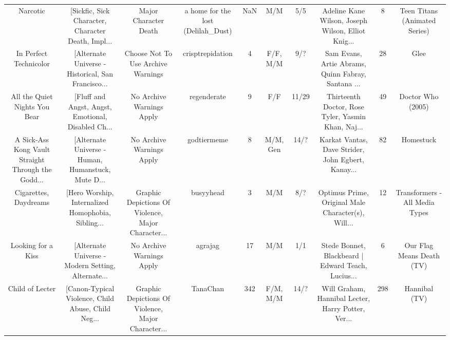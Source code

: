 \begin{table}[h!]
{\begin{tabular}{|c|c|c|c|c|c|c|c|c|c|}
                                          Narcotic & [Sickfic, Sick Character, Character Death, Impl... &                              Major Character Death & a home for the lost (Delilah\_Dust) &       NaN &                              M/M &      5/5 & Adeline Kane Wilson, Joseph Wilson, Elliot Knig... &        8 &                      Teen Titans (Animated Series) \\
                            In Perfect Technicolor & [Alternate Universe - Historical, San Francisco... &                 Choose Not To Use Archive Warnings &                   crisptrepidation &         4 &                         F/F, M/M &      9/? & Sam Evans, Artie Abrams, Quinn Fabray, Santana ... &       28 &                                               Glee \\
                     All the Quiet Nights You Bear & [Fluff and Angst, Angst, Emotional, Disabled Ch... &                          No Archive Warnings Apply &                        regenderate &         9 &                              F/F &    11/29 & Thirteenth Doctor, Rose Tyler, Yasmin Khan, Naj... &       49 &                                  Doctor Who (2005) \\
A Sick-Ass Kong Vault Straight Through the Godd... & [Alternate Universe - Human, Humanstuck, Mute D... &                          No Archive Warnings Apply &                        godtiermeme &         8 &                         M/M, Gen &     14/? & Karkat Vantas, Dave Strider, John Egbert, Kanay... &       82 &                                          Homestuck \\
                             Cigarettes, Daydreams & [Hero Worship, Internalized Homophobia, Sibling... & Graphic Depictions Of Violence, Major Character... &                          busyyhead &         3 &                              M/M &      8/? & Optimus Prime, Original Male Character(s), Will... &       12 &                     Transformers - All Media Types \\
                                Looking for a Kiss & [Alternate Universe - Modern Setting, Alternate... &                          No Archive Warnings Apply &                            agrajag &        17 &                              M/M &      1/1 & Stede Bonnet, Blackbeard | Edward Teach, Lucius... &        6 &                          Our Flag Means Death (TV) \\
                                   Child of Lecter & [Canon-Typical Violence, Child Abuse, Child Neg... & Graphic Depictions Of Violence, Major Character... &                           TanaChan &       342 &                         F/M, M/M &     14/? & Will Graham, Hannibal Lecter, Harry Potter, Ver... &      298 &                                      Hannibal (TV) \\

\end{tabular}}
\end{table}
